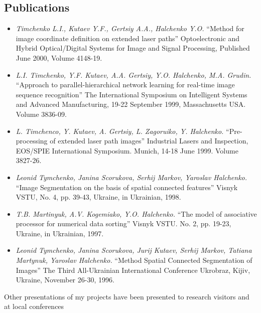 \documentclass[10pt,overlapped,line]{res}
\newcommand{\mtitle}[1]{``#1''}
\newcommand{\mauthors}[1]{ \textit{#1.}}
\newcommand{\mwhere}[1]{#1.}
\begin{document}
\begin{resume}
\section{Publications}

\begin{itemize}
 
 \item 
    \mauthors{Timchenko L.I., Kutaev Y.F., Gertsiy A.A., Halchenko Y.O}
    \mtitle{Method for image coordinate definition on extended laser paths} 
    \mwhere{Optoelectronic and Hybrid Optical/Digital Systems for Image and Signal Processing, Published June 2000,  Volume 4148-19}

 \item 
    \mauthors{L.I. Timchenko, Y.F. Kutaev, A.A. Gertsiy, Y.O. Halchenko,
    M.A. Grudin} 
    \mtitle{Approach to parallel-hierarchical network learning for real-time image sequence recognition} 
    \mwhere{The International Symposium on Intelligent Systems and Advanced Manufacturing, 19-22 September 1999, Massachusetts USA. Volume 3836-09}

  \item 
    \mauthors{L. Timchenco, Y. Kutaev, A. Gertsiy, L. Zagoruiko, Y. Halchenko} 
    \mtitle{Pre-processing of extended laser path images} 
    \mwhere{Industrial Lasers and Inspection, EOS/SPIE International Symposium. Munich, 14-18 June 1999. Volume 3827-26}

  \item 
    \mauthors{Leonid Tymchenko, Janina Scorukova, Serhij Markov, Yaroslav Halchenko} 
    \mtitle{Image Segmentation on the basis of spatial connected features} 
    \mwhere{Visnyk VSTU, No. 4, pp. 39-43, Ukraine, in Ukrainian, 1998}

  \item 
    \mauthors{T.B. Martinyuk, A.V. Kogemiako, Y.O. Halchenko} 
    \mtitle{The model of associative processor for numerical data sorting} 
    \mwhere{ Visnyk VSTU. No. 2, pp. 19-23, Ukraine, in Ukrainian, 1997}

  \item 
    \mauthors{Leonid Tymchenko, Janina Scorukova, Jurij Kutaev, Serhij Markov, Tatiana Martynuk, Yaroslav Halchenko} 
    \mtitle{Method Spatial Connected Segmentation of Images}
    \mwhere{The Third All-Ukrainian International Conference Ukrobraz, Kijiv, Ukraine, November 26-30, 1996}
\end{itemize}

Other presentations of my projects have been presented to research visitors and at local conferences


\end{resume}
\end{document}
